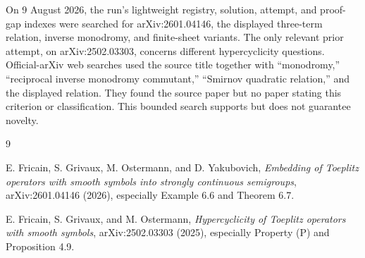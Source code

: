 \documentclass[11pt]{article}
\begin{document}
On 9 August 2026, the run's lightweight registry, solution, attempt, and
proof-gap indexes were searched for arXiv:2601.04146, the displayed three-term
relation, inverse monodromy, and finite-sheet variants.  The only relevant
prior attempt, on arXiv:2502.03303, concerns different hypercyclicity
questions.  Official-arXiv web searches used the source title together with
``monodromy,'' ``reciprocal inverse monodromy commutant,'' ``Smirnov quadratic
relation,'' and the displayed relation.  They found the source paper but no
paper stating this criterion or classification.  This bounded search supports
but does not guarantee novelty.

\small
\begin{thebibliography}{9}

E. Fricain, S. Grivaux, M. Ostermann, and D. Yakubovich,
\emph{Embedding of Toeplitz operators with smooth symbols into strongly
continuous semigroups}, arXiv:2601.04146 (2026), especially Example 6.6 and
Theorem 6.7.

E. Fricain, S. Grivaux, and M. Ostermann,
\emph{Hypercyclicity of Toeplitz operators with smooth symbols},
arXiv:2502.03303 (2025), especially Property (P) and Proposition 4.9.

\end{thebibliography}
\normalsize
\end{document}
